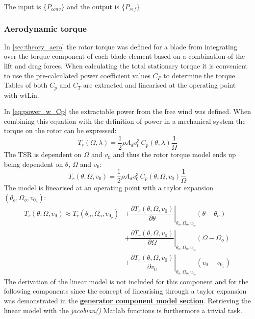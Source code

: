 The input is $ \{P_{conv}\} $ and the output is $ \{P_{ref}\} $


\subsubsection{Aerodynamic torque} \label{sec:comp_aero_torque}
In \cref{sec:theory_aero} the rotor torque was defined for a blade from integrating over the torque component of each blade element based on a combination of the lift and drag forces. When calculating the total stationary torque it is convenient to use the pre-calculated power coefficient values $ C_P $ to determine the torque \cite{Knudsen2013}. Tables of both $ C_p $ and $ C_T $ are extracted and linearised at the operating point with wtLin.

In \cref{eq:power_w_Cp} the extractable power from the free wind was defined. When combining this equation with the definition of power in a mechanical system the torque on the rotor can be expressed:
\begin{equation}\label{eq:comp_Mrot_lambda}
	T_r(\Omega, \lambda) = \dfrac{1}{2} \rho A_d v_0^3 \, C_p(\theta, \lambda) \dfrac{1}{\Omega}
\end{equation}
The TSR is dependent on $ \Omega $ and $ v_0 $ and thus the rotor torque model ends up being dependent on $ \theta $, $ \Omega $ and $ v_0 $:
\begin{equation}\label{eq:comp_Mrot_wind}
	T_r(\theta, \Omega, v_0) = \dfrac{1}{2} \rho A_d v_0^3 \, C_p(\theta, \Omega, v_0) \dfrac{1}{\Omega}
\end{equation}
The model is linearised at an operating point with a taylor expansion $ (\theta_o, \Omega_o, v_{0_o}) $:
\begin{align}
	T_r(\theta, \Omega, v_0) \approx T_r(\theta_o, \Omega_o, v_{0_o}) 
	& + \left. \dfrac{\partial T_r(\theta, \Omega, v_0)}{\partial \theta} \right |_{\theta_o, \Omega_o, v_{0_o}} ( \theta-\theta_o) \\
	& + \left. \dfrac{\partial T_r(\theta, \Omega, v_0)}{\partial \Omega} \right |_{\theta_o, \Omega_o, v_{0_o}} ( \Omega-\Omega_o) \\
	& + \left. \dfrac{\partial T_r(\theta, \Omega, v_0)}{\partial v_0} \right |_{\theta_o, \Omega_o, v_{0_o}} ( v_0 - v_{0_o})
\end{align}
The derivation of the linear model is not included for this component and for the following components since the concept of linearising through a taylor expansion was demonstrated in the \hyperref[sec:comp_generator]{\textbf{generator component model section}}. Retrieving the linear model with the \textit{jacobian()} Matlab functions is furthermore a trivial task.

